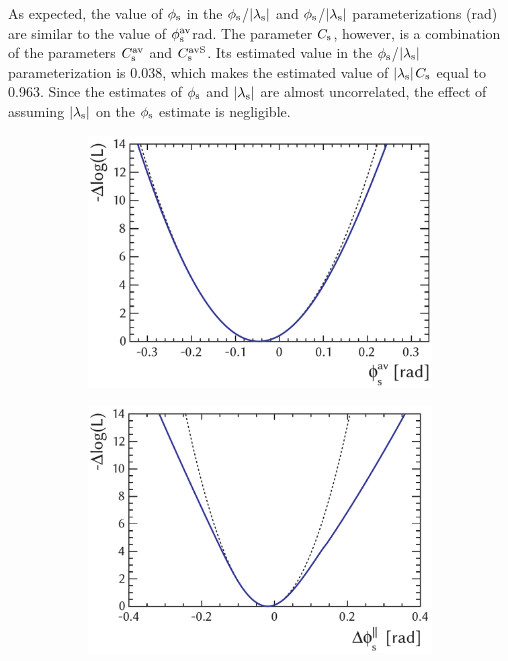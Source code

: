 As expected, the value of $\phi_\text{s}$ in the $\phi_\text{s}$/$|{\lambda_{\text{s}}}|$ and $\phi_\text{s}$/$|{\lambda_{\text{s}}}|$ parameterizations
(\unitsp{}rad) are similar to the value of $\phi_\text{s}^{\text{av}}$\texteq{}\unitsp{}rad. The parameter $C_\text{s}$,
however, is a combination of the parameters $C_\text{s}^\text{av}$ and $C_\text{s}^\text{avS}$. Its estimated value in the $\phi_\text{s}$/$|{\lambda_{\text{s}}}|$ parameterization is
0.038, which makes the estimated value of $|{\lambda_{\text{s}}}|$\textminus$C_\text{s}$ equal to 0.963. Since the estimates
of $\phi_\text{s}$ and $|{\lambda_{\text{s}}}|$ are almost uncorrelated, the effect of assuming $|{\lambda_{\text{s}}}|$ on the $\phi_\text{s}$ estimate is negligible.

\begin{figure}[tb]
  \centering
  \begin{subfigure}{0.49\textwidth}
    \includegraphics[width=\textwidth]{graphics/results/NLL_polarDep_phiCPAv}
    \caption{}
  \end{subfigure}
  \hfill%
  \begin{subfigure}{0.49\textwidth}
    \includegraphics[width=\textwidth]{graphics/results/NLL_polarDep_phiCPRel_Apar}
    \caption{}
  \end{subfigure}


\end{figure}
